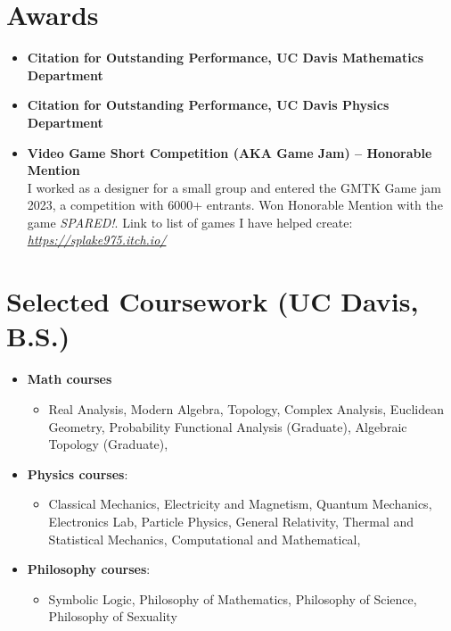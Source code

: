 \documentclass{curriculum-vitae}
\begin{document}
\section*{Awards}
\begin{itemize}
    \item \textbf{Citation for Outstanding Performance, UC Davis Mathematics Department} 
    \item \textbf{Citation for Outstanding Performance, UC Davis Physics Department} 
    \item \textbf{Video Game Short Competition (AKA Game Jam) -- Honorable Mention}\\
    I worked as a designer for a small group and entered the GMTK Game jam 2023, a competition with 6000+ entrants. Won Honorable Mention with the game \emph{SPARED!}. Link to list of games I have helped create: \emph{\href{https://splake975.itch.io/}{https://splake975.itch.io/} }
\end{itemize}


\section{Selected Coursework (UC Davis, B.S.)}
\begin{itemize}
    \item\textbf{Math courses}
    \begin{itemize}
        \item Real Analysis,
        Modern Algebra,
        Topology, 
        Complex Analysis,
        Euclidean Geometry,
        Probability
        Functional Analysis (Graduate),
        Algebraic Topology (Graduate),
    \end{itemize}


    \item\textbf{Physics courses}:
    \begin{itemize}
        \item Classical Mechanics,
        Electricity and Magnetism,
        Quantum Mechanics,
        Electronics Lab,
        Particle Physics,
        General Relativity,
        Thermal and Statistical Mechanics,
        Computational and Mathematical,

    \end{itemize}

    \item\textbf{Philosophy courses}:
    \begin{itemize}
        \item Symbolic Logic,
        Philosophy of Mathematics, 
        Philosophy of Science,
        Philosophy of Sexuality
    \end{itemize}
\end{itemize}
\end{document}
